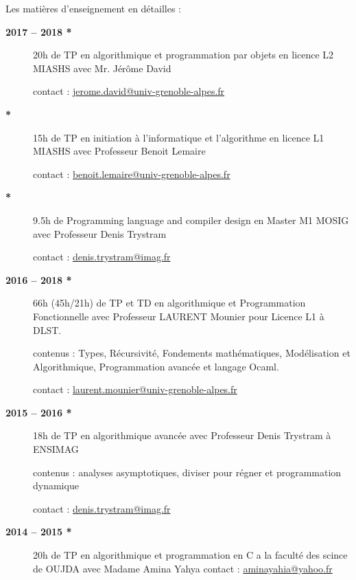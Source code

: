 \documentclass[11pt,final,french]{article}	%
\begin{document}
Les matières d'enseignement en détailles :



\begin{description}
    \item [\textbf{ 2017 -- 2018 *} ]  20h de TP en algorithmique et programmation par objets en licence L2 MIASHS avec Mr. Jérôme David

        \par    contact :  \href{mailto:jerome.david@univ-grenoble-alpes.fr  }{ jerome.david@univ-grenoble-alpes.fr }

    \item [ \hspace{2.3cm} \textbf{*} ]  15h de TP en initiation à l'informatique et l'algorithme en licence L1 MIASHS avec Professeur Benoit Lemaire
        \par    contact :  \href{mailto:benoit.lemaire@univ-grenoble-alpes.fr}{benoit.lemaire@univ-grenoble-alpes.fr}
     \item [ \hspace{2.3cm} \textbf{*} ]  9.5h de Programming language and compiler design en Master M1 MOSIG avec Professeur Denis Trystram
        \par contact : \href{mailto:denis.trystram@imag.fr}{denis.trystram@imag.fr}
        
    \item [\textbf{ 2016 -- 2018 *} ]  66h (45h/21h)  de TP et TD en algorithmique et Programmation Fonctionnelle avec Professeur LAURENT Mounier pour Licence L1 à DLST. 
	    \par    contenus : Types, Récursivité, Fondements mathématiques, Modélisation et Algorithmique, Programmation avancée et langage Ocaml. 
        \par    contact :  \href{mailto:laurent.mounier@univ-grenoble-alpes.fr}{laurent.mounier@univ-grenoble-alpes.fr}
%
    \item [\textbf{ 2015 -- 2016 *} ]  18h de TP en algorithmique avancée avec Professeur Denis Trystram à ENSIMAG  
        \par contenus : analyses asymptotiques, diviser pour régner et programmation dynamique
        \par contact : \href{mailto:denis.trystram@imag.fr}{denis.trystram@imag.fr}



    \item [\textbf{ 2014 -- 2015 *} ]%
         20h de TP en algorithmique et programmation en C a la faculté des scince de OUJDA avec Madame Amina Yahya
	     contact :  \href{mailto:aminayahia@yahoo.fr}{aminayahia@yahoo.fr}
%
\end{description}

%
\end{document}

